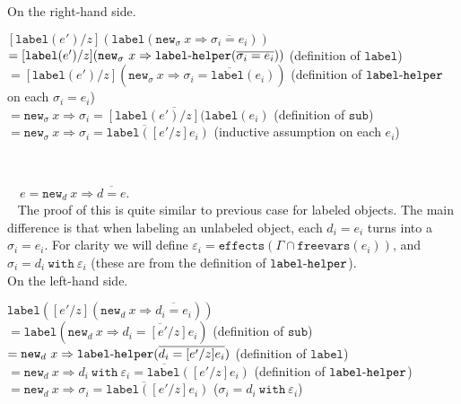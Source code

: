 \documentclass{llncs}
\newcommand{\keywadj}[1]{\mathtt{#1}}
\newcommand{\keyw}[1]{\keywadj{#1}~}
\newcommand{\kw}[1]{\keyw{ #1 }}
\newcommand{\kwa}[1]{\keywadj{ #1 }}
\newcommand{\hyphen}{\hbox{-}}
\newcommand{\proofcase}[2]{
	\begin{adjustwidth}{1.5em}{0pt}
		\fbox{Case.}~~#1. \\ ~#2
	\end{adjustwidth}
}
\newcommand{\newd}[0]{
	\keywadj{new}_d~x \Rightarrow \overline{d = e}
}
\begin{document}
{{\noindent
On the right-hand side.
\begin{adjustwidth}{1.5em}{0em}
$[\kwa{label}(e')/z](\kwa{label}(\kwa{new}_\sigma~x \Rightarrow \overline{\sigma_i = e_i}))$ \\
$= [\kwa{label}(e')/z](\kwa{new}_\sigma~x \Rightarrow \kwa{label \hyphen helper}(\overline{\sigma_i = e_i}))$
\tabto{24em} (definition of $\kwa{label}$) \\
$= [\kwa{label}(e')/z](\kwa{new}_\sigma~x \Rightarrow \overline{\sigma_i = \kwa{label}(e_i)})$
\tabto{24em} (definition of $\kwa{label \hyphen helper}$ on each $\sigma_i = e_i$) \\
$= \kwa{new}_\sigma~x \Rightarrow \overline{\sigma_i = [\kwa{label}(e')/z](\kwa{label}(e_i)}$
\tabto{24em} (definition of $\kwa{sub}$) \\
$= \kwa{new}_\sigma~x \Rightarrow \overline{\sigma_i = \kwa{label}([e'/z]e_i)}$
\tabto{24em} (inductive assumption on each $e_i$)
\end{adjustwidth}~
}

\proofcase{$e = \newd$}{
The proof of this is quite similar to previous case for labeled objects. The main difference is that when labeling an unlabeled object, each $d_i = e_i$ turns into a $\sigma_i = e_i$. For clarity we will define $\varepsilon_i = \kwa{effects}(\Gamma \cap \kwa{freevars}(e_i))$, and $\sigma_i = d_i~\kw{with} \varepsilon_i$ (these are from the definition of $\kwa{label \hyphen helper}$).\\

\noindent
On the left-hand side.
\begin{adjustwidth}{1.5em}{0em}
$\kwa{label}([e'/z](\kwa{new}_d~x \Rightarrow \overline{d_i = e_i}))$ \\
$= \kwa{label}( \kwa{new}_d~x \Rightarrow \overline{d_i = [e'/z]e_i} )$
\tabto{24em} (definition of $\kwa{sub}$) \\
$= \kwa{new}_d~x \Rightarrow \kwa{label \hyphen helper}(\overline{d_i = [e'/z]e_i})$
\tabto{24em} (definition of $\kwa{label}$) \\
$= \kwa{new}_d~x \Rightarrow \overline{d_i~\kw{with} \varepsilon_i = \kwa{label}([e'/z]e_i)}$
\tabto{24em} (definition of $\kwa{label \hyphen helper}$) \\
$= \kwa{new}_d~x \Rightarrow \overline{\sigma_i = \kwa{label}([e'/z]e_i)}$
\tabto{24em} ($\sigma_i = d_i~\kw{with} \varepsilon_i$) 


\end{adjustwidth}~

}}
\end{document}
